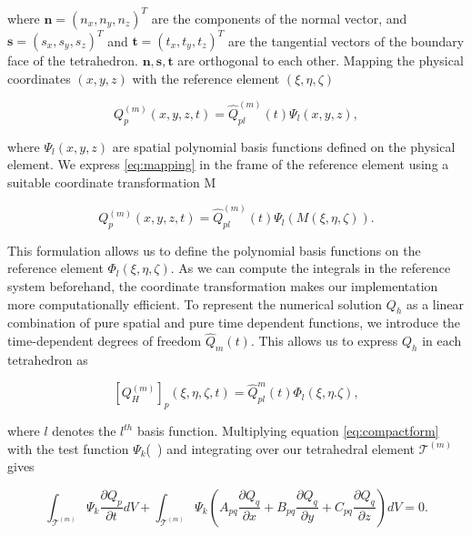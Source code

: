 where $\mathbf{n} = \left(n_x, n_y, n_z\right)^T$ are the components of the normal vector, and $\mathbf{s} = \left(s_x, s_y, s_z\right)^T$ and
$\mathbf{t} = \left(t_x, t_y, t_z\right)^T$ are the tangential vectors of the boundary face of the tetrahedron. $\mathbf{n}, \mathbf{s}, \mathbf{t}$
are orthogonal to each other. Mapping the physical coordinates $\left(x, y, z\right)$ with the reference element $\left(\xi, \eta, \zeta\right)$

\begin{equation}
    Q_p^{\left(m\right)} \left(x,y,z,t\right) = \hat{Q}_{pl}^{\left(m\right)} \left(t\right) \Psi_l \left(x, y, z\right),
    \label{eq:mapping}
\end{equation}

where $\Psi_l\left(x,y,z\right)$ are spatial polynomial basis functions defined on the physical element. We express \ref{eq:mapping} in 
the frame of the reference element using a suitable coordinate transformation M

\begin{equation}
     Q_p^{\left(m\right)}\left(x,y,z,t\right) = \hat{Q}_{pl}^{\left(m\right)}\left(t\right) \Psi_l\left(M\left(\xi, \eta, \zeta\right)\right).
\end{equation}

This formulation allows us to define the polynomial basis functions on the reference element $\Phi_l\left(\xi, \eta, \zeta\right)$.
As we can compute the integrals in the reference system beforehand, the coordinate transformation makes our implementation more computationally
efficient. To represent the numerical solution $Q_h$ as a linear combination of pure spatial and pure time dependent functions, we introduce
the time-dependent degrees of freedom $\hat{Q}_m\left(t\right)$. This allows us to express $Q_h$ in each tetrahedron as 

\begin{equation}
    \left[Q_H^{\left(m\right)}\right]_p \left(\xi, \eta, \zeta, t\right) = \hat{Q}_{pl}^m \left(t\right) \Phi_l \left(\xi, \eta. \zeta\right),
\label{eq:solution}
\end{equation}

where $l$ denotes the $l^{th}$ basis function. Multiplying equation \ref{eq:compactform} with the test function $\Psi_k$(~\parencite{cockburn2011discontinuous})
and integrating over our tetrahedral element $\mathcal{T}^{\left(m\right)}$ gives

\begin{equation}
    \int_{\mathcal{T}^{\left(m\right)}} \Psi_k \frac{\partial Q_p}{\partial t} dV + \int_{\mathcal{T}^{\left(m\right)}} \Psi_k \left(A_{pq} 
    \frac{\partial Q_q}{\partial x} + B_{pq}\frac{\partial Q_q}{\partial y} + C_{pq}\frac{\partial Q_q}{\partial z}\right)dV = 0.
    \label{eq:preweakformulation}
\end{equation}

